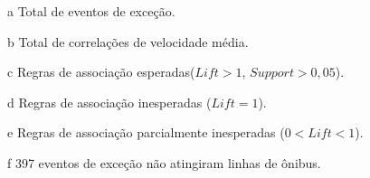 \documentclass[
	12pt,				%
	oneside,			%
	a4paper,			%
	english,			%
	brazil				%
	]{abntex2ppgsi}
\begin{document}
{{{\begin{apendicesenv}
\begin{table}[!htb]
\begin{threeparttable}
\begin{tablenotes}
            \item[a] Total de eventos de exceção.
            \item[b] Total de correlações de velocidade média.
            \item[c] Regras de associação esperadas($Lift > 1$, $Support > 0,05$).
            \item[d] Regras de associação inesperadas ($Lift = 1$).
            \item[e] Regras de associação parcialmente inesperadas ($0 < Lift < 1$).
            \item[f] 397 eventos de exceção não atingiram linhas de ônibus.
        \end{tablenotes}
\end{threeparttable}
\end{table}



\end{apendicesenv}}}}
\end{document}
